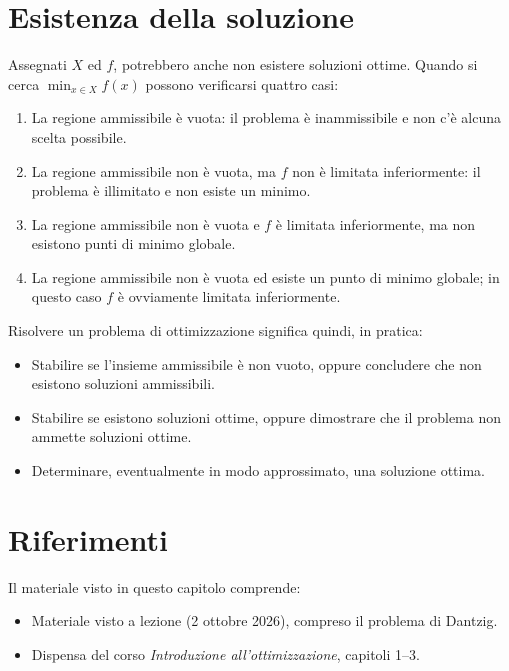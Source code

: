 \section{Esistenza della soluzione}
Assegnati $X$ ed $f$, potrebbero anche non esistere soluzioni ottime. Quando si cerca $\min_{x \in X} f(x)$ possono verificarsi quattro casi:
\begin{enumerate}
    \item La regione ammissibile è vuota: il problema è inammissibile e non c'è alcuna scelta possibile.
    \item La regione ammissibile non è vuota, ma $f$ non è limitata inferiormente: il problema è illimitato e non esiste un minimo.
    \item La regione ammissibile non è vuota e $f$ è limitata inferiormente, ma non esistono punti di minimo globale.
    \item La regione ammissibile non è vuota ed esiste un punto di minimo globale; in questo caso $f$ è ovviamente limitata inferiormente.
\end{enumerate}

Risolvere un problema di ottimizzazione significa quindi, in pratica:
\begin{itemize}
    \item Stabilire se l'insieme ammissibile è non vuoto, oppure concludere che non esistono soluzioni ammissibili.
    \item Stabilire se esistono soluzioni ottime, oppure dimostrare che il problema non ammette soluzioni ottime.
    \item Determinare, eventualmente in modo approssimato, una soluzione ottima.
\end{itemize}

\section*{Riferimenti}
Il materiale visto in questo capitolo comprende:
\begin{itemize}
    \item Materiale visto a lezione (2 ottobre 2026), compreso il problema di Dantzig.
    \item Dispensa del corso \emph{Introduzione all'ottimizzazione}, capitoli 1--3.
\end{itemize}
